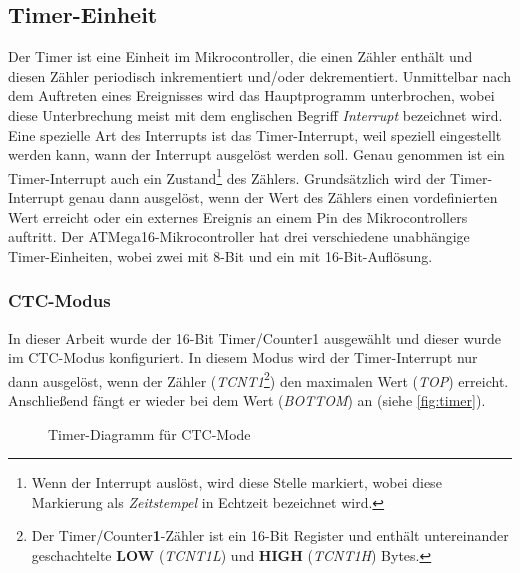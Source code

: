 \subsection{Timer-Einheit}

Der Timer ist eine Einheit im Mikrocontroller, die einen Zähler enthält und diesen Zähler periodisch inkrementiert und/oder dekrementiert. Unmittelbar nach dem Auftreten eines Ereignisses wird das Hauptprogramm unterbrochen, wobei diese Unterbrechung meist mit dem englischen Begriff \textit{Interrupt} bezeichnet wird. Eine spezielle Art des Interrupts ist das Timer-Interrupt, weil speziell eingestellt werden kann, wann der Interrupt ausgelöst werden soll. Genau genommen ist ein Timer-Interrupt auch ein Zustand\footnote{Wenn der Interrupt auslöst, wird diese Stelle markiert, wobei diese Markierung als \textit{Zeitstempel} in Echtzeit bezeichnet wird.} des Zählers. Grundsätzlich wird der Timer-Interrupt genau dann ausgelöst, wenn der Wert des Zählers einen vordefinierten Wert erreicht oder ein externes Ereignis an einem Pin des Mikrocontrollers auftritt. Der ATMega16-Mikrocontroller hat drei verschiedene unabhängige Timer-Einheiten, wobei zwei mit 8-Bit und ein mit 16-Bit-Auflösung. 

\subsubsection{CTC-Modus}

In dieser Arbeit wurde der 16-Bit Timer/Counter1 ausgewählt und dieser wurde im CTC-Modus konfiguriert. In diesem Modus wird der Timer-Interrupt nur dann ausgelöst, wenn der Zähler (\textit{TCNT1}\footnote{Der Timer/Counter\textbf{1}-Zähler ist ein 16-Bit Register und enthält untereinander geschachtelte \textbf{LOW} (\textit{TCNT1L}) und \textbf{HIGH} (\textit{TCNT1H}) Bytes.}) den maximalen Wert (\textit{TOP}) erreicht. Anschließend fängt er wieder bei dem Wert (\textit{BOTTOM}) an (siehe \autoref{fig:timer}). \smallskip \smallskip

\begin{figure}[htbp]
	\centering
	\caption[Timer-Diagramm für CTC-Mode]{Timer-Diagramm für CTC-Mode \cite{Atmel:ATMega16}}\label{fig:timer}
\end{figure}
\smallskip \smallskip


